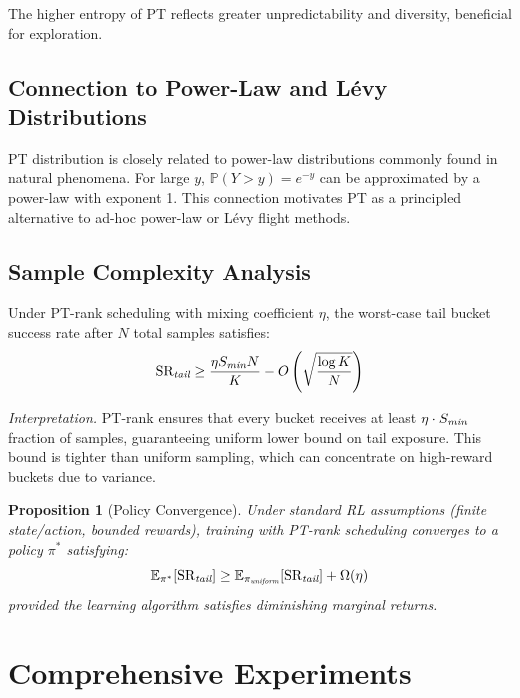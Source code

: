 \documentclass[11pt, a4paper, oneside]{article}
\theoremstyle{plain}
\newtheorem{prop}{Proposition}[section]
\theoremstyle{break}
\theoremstyle{plain}
\theoremstyle{breakdef}
\theoremstyle{plain}
\theoremstyle{breakrem}
\theoremstyle{plain}
\theoremstyle{breakrem}
\begin{document}
The higher entropy of PT reflects greater unpredictability and diversity, beneficial for exploration.

\subsection{Connection to Power-Law and L\'evy Distributions}

PT distribution is closely related to power-law distributions commonly found in natural phenomena. For large $y$, $\mathbb{P}(Y > y) = e^{-y}$ can be approximated by a power-law with exponent 1. This connection motivates PT as a principled alternative to ad-hoc power-law or L\'evy flight methods.

\subsection{Sample Complexity Analysis}

\begin{ theorem}
Under PT-rank scheduling with mixing coefficient $\eta$, the worst-case tail bucket success rate after $N$ total samples satisfies:
\begin{equation}
\text{SR}_{\emph{tail}} \geq \frac{\eta S_{\emph{min}} N}{K} - O\left(\sqrt{\frac{\log K}{N}}\right)
\end{equation}
\end{ theorem}

\textit{Interpretation.} PT-rank ensures that every bucket receives at least $\eta \cdot S_{\emph{min}}$ fraction of samples, guaranteeing uniform lower bound on tail exposure. This bound is tighter than uniform sampling, which can concentrate on high-reward buckets due to variance.

\begin{prop}[Policy Convergence]
Under standard RL assumptions (finite state/action, bounded rewards), training with PT-rank scheduling converges to a policy $\pi^*$ satisfying:
$$\mathbb{E}_{\pi^*}[\text{SR}_{\emph{tail}}] \geq \mathbb{E}_{\pi_{\emph{uniform}}}[\text{SR}_{\emph{tail}}] + \Omega(\eta)$$
provided the learning algorithm satisfies diminishing marginal returns.
\end{prop}

\section{Comprehensive Experiments}
\label{sec:exp}
\end{document}
